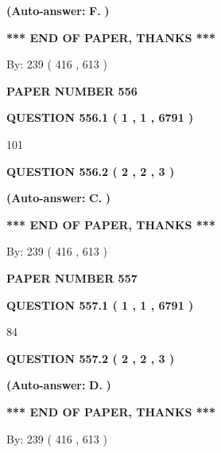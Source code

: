 \documentclass{ctexart}
\begin{document}
 
{\textbf{(Auto-answer:}}
{\textbf{\large{
F.}}}
{\textbf{)}}
 
 
   
   
   
   
\vspace{1.0in} 
{\textbf{\large{ *** END OF PAPER, THANKS *** }}} 
   
   
\hspace{1.0in} By: 
 239 ( 416 ,  613 )
   
   
   
   
\newpage 
\setcounter{page}{ 
   556001 } 
   
   
 {\textbf{ \Large{ PAPER NUMBER  556  }}}
   
   
   
   
  
  
{\textbf{\large{QUESTION
556.1 
 ( 1 , 1 , 6791 )
}}}

101
  
  
{\textbf{\large{QUESTION
556.2 
 ( 2 , 2 , 3 )
}}}
 
 
{\textbf{(Auto-answer:}}
{\textbf{\large{
C.}}}
{\textbf{)}}
 
 
   
   
   
   
\vspace{1.0in} 
{\textbf{\large{ *** END OF PAPER, THANKS *** }}} 
   
   
\hspace{1.0in} By: 
 239 ( 416 ,  613 )
   
   
   
   
\newpage 
\setcounter{page}{ 
   557001 } 
   
   
 {\textbf{ \Large{ PAPER NUMBER  557  }}}
   
   
   
   
  
  
{\textbf{\large{QUESTION
557.1 
 ( 1 , 1 , 6791 )
}}}

84
  
  
{\textbf{\large{QUESTION
557.2 
 ( 2 , 2 , 3 )
}}}
 
 
{\textbf{(Auto-answer:}}
{\textbf{\large{
D.}}}
{\textbf{)}}
 
 
   
   
   
   
\vspace{1.0in} 
{\textbf{\large{ *** END OF PAPER, THANKS *** }}} 
   
   
\hspace{1.0in} By: 
 239 ( 416 ,  613 )
   
   
   
\end{document}
